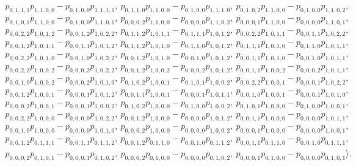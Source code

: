 \documentclass[11pt, a4paper]{article}
\numberwithin{equation}{section}
\theoremstyle{plain}
\theoremstyle{definition}
\begin{document}
{\begin{gather*}
     p_{0, 1, 1, 1}p_{1, 1, 0, 0}-p_{0, 1, 0, 0}p_{1, 1, 1, 1},\ p_{0, 1, 1, 0}p_{1, 1, 0, 0}-p_{0, 1, 0, 0}p_{1, 1, 1, 0},\ p_{0, 1, 0, 2}p_{1, 1, 0, 0}-p_{0, 1, 0, 0}p_{1, 1, 0, 2},\\
     p_{0, 1, 0, 1}p_{1, 1,0, 0}-p_{0, 1, 0, 0}p_{1, 1, 0, 1},\ p_{0, 0, 0, 2}p_{1, 1, 0, 0}-p_{0, 0, 0, 0}p_{1, 1, 0, 2},\ p_{0, 0, 0, 1}p_{1, 1, 0, 0}-p_{0, 0, 0, 0}p_{1, 1, 0, 1},\\
     p_{0, 0, 2, 2}p_{1, 0, 1, 2}-p_{0, 0, 1,2}p_{1, 0, 2, 2},\ p_{0, 1, 1, 2}p_{1, 0, 1, 1}-p_{0, 1, 1, 1}p_{1, 0, 1, 2},\ p_{0, 0, 2, 2}p_{1, 0, 1, 1}-p_{0, 0, 1, 1}p_{1, 0, 2, 2},\\
     p_{0, 0, 1, 2}p_{1, 0, 1, 1}-p_{0, 0, 1, 1}p_{1, 0, 1, 2},\ p_{0,1, 1, 2}p_{1, 0, 1, 0}-p_{0, 1, 1, 0}p_{1, 0, 1, 2},\ p_{0, 1, 1, 1}p_{1, 0, 1, 0}-p_{0, 1, 1, 0}p_{1, 0, 1, 1},\\
     p_{0, 0, 2, 2}p_{1, 0, 1, 0}-p_{0, 0, 1, 0}p_{1, 0, 2, 2},\ p_{0, 0, 1, 2}p_{1, 0, 1,0}-p_{0, 0, 1, 0}p_{1, 0, 1, 2},\ p_{0, 0, 1, 1}p_{1, 0, 1, 0}-p_{0, 0, 1, 0}p_{1, 0, 1, 1},\\
     p_{0, 0, 2, 2}p_{1, 0, 0, 2}-p_{0, 0, 0, 2}p_{1, 0, 2, 2},\ p_{0, 0, 1, 2}p_{1, 0, 0, 2}-p_{0, 0, 0, 2}p_{1,0, 1, 2},\ p_{0, 0, 1, 1}p_{1, 0, 0, 2}-p_{0, 0, 0, 2}p_{1, 0, 1, 1},\\
     p_{0, 0, 1, 0}p_{1, 0, 0, 2}-p_{0, 0, 0, 2}p_{1, 0, 1, 0},\ p_{0, 1, 0, 2}p_{1, 0, 0, 1}-p_{0, 1, 0, 1}p_{1, 0, 0, 2},\ p_{0, 0, 2,2}p_{1, 0, 0, 1}-p_{0, 0, 0, 1}p_{1, 0, 2, 2},\\
     p_{0, 0, 1, 2}p_{1, 0, 0, 1}-p_{0, 0, 0, 1}p_{1, 0, 1, 2},\ p_{0, 0, 1, 1}p_{1, 0, 0, 1}-p_{0, 0, 0, 1}p_{1, 0, 1, 1},\ p_{0, 0, 1, 0}p_{1, 0, 0, 1}-p_{0, 0, 0, 1}p_{1, 0, 1, 0},\\
     p_{0, 0, 0, 2}p_{1, 0, 0, 1}-p_{0, 0, 0, 1}p_{1, 0, 0, 2},\ p_{0, 1, 0, 2}p_{1, 0, 0, 0}-p_{0, 1, 0, 0}p_{1, 0, 0, 2},\ p_{0, 1, 0, 1}p_{1, 0, 0, 0}-p_{0, 1, 0, 0}p_{1, 0, 0, 1},\\
      p_{0, 0, 2, 2}p_{1, 0, 0, 0}-p_{0, 0, 0, 0}p_{1, 0, 2, 2},\ p_{0, 0, 1, 2}p_{1, 0, 0, 0}-p_{0, 0, 0, 0}p_{1, 0, 1, 2},\ p_{0, 0, 1, 1}p_{1, 0, 0, 0}-p_{0, 0, 0, 0}p_{1, 0, 1, 1},\\
      p_{0, 0, 1, 0}p_{1, 0,0, 0}-p_{0, 0, 0, 0}p_{1, 0, 1, 0},\ p_{0, 0, 0, 2}p_{1, 0, 0, 0}-p_{0, 0, 0, 0}p_{1, 0, 0, 2},\ p_{0, 0, 0, 1}p_{1, 0, 0, 0}-p_{0, 0, 0, 0}p_{1, 0, 0, 1},\\
      p_{0, 0, 1, 2}p_{0, 1, 1, 1}-p_{0, 0, 1,1}p_{0, 1, 1, 2},\ p_{0, 0, 1, 2}p_{0, 1, 1, 0}-p_{0, 0, 1, 0}p_{0, 1, 1, 2},\ p_{0, 0, 1, 1}p_{0, 1, 1, 0}-p_{0, 0, 1, 0}p_{0, 1, 1, 1},\\
      p_{0, 0, 0, 2}p_{0, 1, 0, 1}-p_{0, 0, 0, 1}p_{0, 1, 0, 2},\ p_{0,0, 0, 2}p_{0, 1, 0, 0}-p_{0, 0, 0, 0}p_{0, 1, 0, 2},\ p_{0, 0, 0, 1}p_{0, 1, 0, 0}-p_{0, 0, 0, 0}p_{0, 1, 0, 1} \rangle.
\end{gather*}

}
\end{document}
